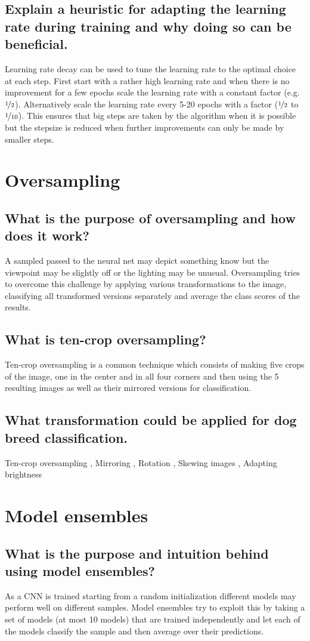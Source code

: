 \subsection{Explain a heuristic for adapting the learning rate during training and why doing so can be beneficial.}
Learning rate decay can be used to tune the learning rate to the optimal choice at each step. First start with a rather high learning rate and when there is no improvement for a few epochs scale the learning rate with a constant factor (e.g. $\nicefrac 1 2$).
Alternatively scale the learning rate every 5-20 epochs with a factor ($\nicefrac 1 2$ to $\nicefrac 1 {10}$). This ensures that big steps are taken by the algorithm when it is possible but the stepsize is reduced when further improvements can only be made by smaller steps.
%
\section{Oversampling}
\subsection{What is the purpose of oversampling and how does it work?}
A sampled passed to the neural net may depict something know but the viewpoint may be slightly off or the lighting may be unusual. Oversampling tries to overcome this challenge by applying various transformations to the image, classifying all transformed versions separately and average the class scores of the results. 
\subsection{What is ten-crop oversampling?}
Ten-crop oversampling is a common technique which consists of making five crops of the image, one in the center and in all four corners and then using the 5 resulting images as well as their mirrored versions for classification. 
\subsection{What transformation could be applied for dog breed classification.}
Ten-crop oversampling
, Mirroring
, Rotation
, Skewing images
, Adapting brightness
%
\section{Model ensembles}
\subsection{What is the purpose and intuition behind using model ensembles?}
As a CNN is trained starting from a random initialization different models may perform well on different samples. Model ensembles try to exploit this by taking a set of models (at most 10 models) that are trained independently and let each of the models classify the sample and then average over their predictions.
